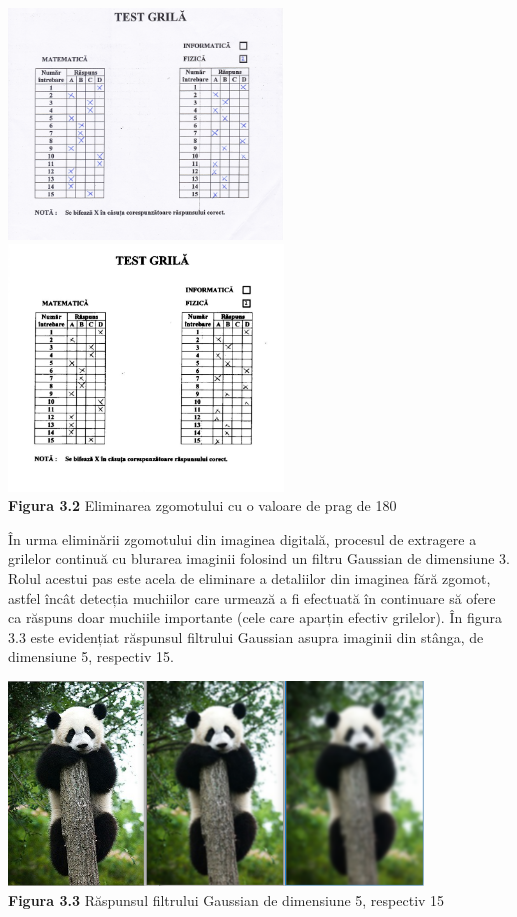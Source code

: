 \documentclass[a4paper,12pt]{report}
\newcommand\tab[1][1cm]{\hspace*{#1}}
\begin{document}
\begin {center} 
	\begin {footnotesize} 
		\includegraphics[width = 73mm]{fig3_2_1} 
		\includegraphics[width = 73mm]{fig3_2_2} \\
		\textbf  {Figura 3.2} Eliminarea zgomotului cu o valoare de prag de 180 
	\end {footnotesize} 
\end {center}
\tab În urma eliminării zgomotului din imaginea digitală, procesul de extragere a grilelor continuă cu blurarea imaginii folosind un filtru Gaussian de dimensiune 3. Rolul acestui pas este acela de eliminare a detaliilor din imaginea fără zgomot, astfel încât detecția muchiilor care urmează a fi efectuată în continuare să ofere ca răspuns doar muchiile importante (cele care aparțin efectiv grilelor). În figura 3.3 este evidențiat răspunsul filtrului Gaussian asupra imaginii din stânga, de dimensiune 5, respectiv 15.
\begin {center} 
	\begin {footnotesize} 
		\includegraphics[width = 110mm]{fig3_3}\\
		\textbf  {Figura 3.3} Răspunsul filtrului Gaussian de dimensiune 5, respectiv 15 
	\end {footnotesize} 
\end {center}
\end{document}
